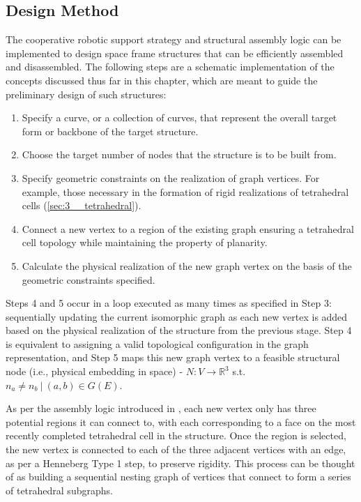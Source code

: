 \subsection{Design Method} \label{sec:4__method}
    The cooperative robotic support strategy and structural assembly logic can be implemented to design space frame structures that can be efficiently assembled and disassembled. The following steps are a schematic implementation of the concepts discussed thus far in this chapter, which are meant to guide the preliminary design of such structures:
    
    \begin{enumerate}
        \item Specify a curve, or a collection of curves, that represent the overall target form or backbone of the target structure.
        \item Choose the target number of nodes that the structure is to be built from.
        \item Specify geometric constraints on the realization of graph vertices. For example, those necessary in the formation of rigid realizations of tetrahedral cells (\cref{sec:3__tetrahedral}).
        \item Connect a new vertex to a region of the existing graph ensuring a tetrahedral cell topology while maintaining the property of planarity.
        \item Calculate the physical realization of the new graph vertex on the basis of the geometric constraints specified.
    \end{enumerate}
    
    Steps 4 and 5 occur in a loop executed as many times as specified in Step 3: sequentially updating the current isomorphic graph as each new vertex is added based on the physical realization of the structure from the previous stage. Step 4 is equivalent to assigning a valid topological configuration in the graph representation, and Step 5 maps this new graph vertex to a feasible structural node (i.e., physical embedding in space) - $N: V \rightarrow \mathbb{R}^3$ s.t. $n_a \neq n_b \ | \ (a,b) \in G(E)$.
    
    As per the assembly logic introduced in , each new vertex only has three potential regions it can connect to, with each corresponding to a face on the most recently completed tetrahedral cell in the structure. Once the region is selected, the new vertex is connected to each of the three adjacent vertices with an edge, as per a Henneberg Type 1 step, to preserve rigidity. This process can be thought of as building a sequential nesting graph of vertices that connect to form a series of tetrahedral subgraphs.
    
